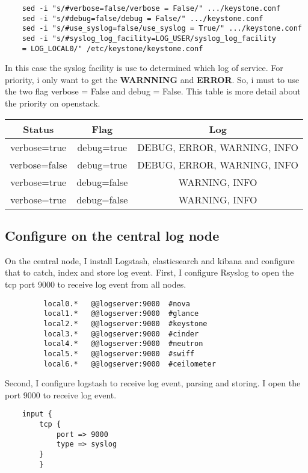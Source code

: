 	\begin{verbatim}
	sed -i "s/#verbose=false/verbose = False/" .../keystone.conf 
	sed -i "s/#debug=false/debug = False/" .../keystone.conf 
	sed -i "s/#use_syslog=false/use_syslog = True/" .../keystone.conf
	sed -i "s/#syslog_log_facility=LOG_USER/syslog_log_facility 
	= LOG_LOCAL0/" /etc/keystone/keystone.conf
	\end{verbatim}
In this case the syslog facility is use to determined which log of service. For priority, i only want to get the \textbf{WARNNING} and \textbf{ERROR}. 
So, i must to use the two flag verbose = False and debug = False. This table is more detail about the priority on openstack.

\begin{center}
\begin{tabular}{ |c|c|c| } 
 \hline
 Status 			 & Flag 				& Log \\ 
 \hline
 verbose=true	 & debug=true		& DEBUG, ERROR, WARNING, INFO \\ 
 verbose=false & debug=true	  & DEBUG, ERROR, WARNING, INFO \\ 
 verbose=true	 & debug=false	& WARNING, INFO \\ 
 verbose=true	 & debug=false	& WARNING, INFO \\ 
 \hline
\end{tabular}
\end{center}

\subsection{Configure on the central log node}
On the central node, I install Logstash, elasticsearch and kibana and configure that to catch, index and store log event. 
First, I configure Rsyslog to open the tcp port 9000 to receive log event from all nodes.
	\begin{verbatim}
		 local0.* 	@@logserver:9000  #nova
		 local1.* 	@@logserver:9000  #glance
		 local2.* 	@@logserver:9000  #keystone
		 local3.* 	@@logserver:9000  #cinder
		 local4.* 	@@logserver:9000  #neutron
		 local5.* 	@@logserver:9000  #swiff
		 local6.* 	@@logserver:9000  #ceilometer
	\end{verbatim}
Second, I configure logstash to receive log event, parsing and storing. I open the port 9000 to receive log event. 
\begin{verbatim}
	input {
		tcp {
	    	port => 9000
	    	type => syslog
	  	}	
		}
\end{verbatim}


